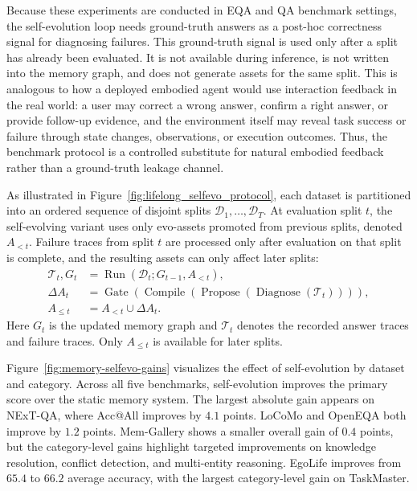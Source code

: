 Because these experiments are conducted in EQA and QA benchmark settings, the self-evolution loop needs ground-truth answers as a post-hoc correctness signal for diagnosing failures.
This ground-truth signal is used only after a split has already been evaluated.
It is not available during inference, is not written into the memory graph, and does not generate assets for the same split.
This is analogous to how a deployed embodied agent would use interaction feedback in the real world: a user may correct a wrong answer, confirm a right answer, or provide follow-up evidence, and the environment itself may reveal task success or failure through state changes, observations, or execution outcomes.
Thus, the benchmark protocol is a controlled substitute for natural embodied feedback rather than a ground-truth leakage channel.

As illustrated in Figure~\ref{fig:lifelong_selfevo_protocol}, each dataset is partitioned into an ordered sequence of disjoint splits
$\mathcal{D}_1,\ldots,\mathcal{D}_T$.
At evaluation split $t$, the self-evolving variant uses only evo-assets promoted from previous splits, denoted $A_{<t}$.
Failure traces from split $t$ are processed only after evaluation on that split is complete, and the resulting assets can only affect later splits:
\begin{align}
    \mathcal{T}_t, G_t
    &= \operatorname{Run}(\mathcal{D}_t; G_{t-1}, A_{<t}), \\
    \Delta A_t
    &= \operatorname{Gate}\!\left(
        \operatorname{Compile}\!\left(
        \operatorname{Propose}\!\left(
        \operatorname{Diagnose}(\mathcal{T}_t)
        \right)\right)\right), \\
    A_{\leq t}
    &= A_{<t} \cup \Delta A_t .
    \label{eq:memory_eval_self_evo_update}
\end{align}
Here $G_t$ is the updated memory graph and $\mathcal{T}_t$ denotes the recorded answer traces and failure traces.
Only $A_{\leq t}$ is available for later splits.


Figure~\ref{fig:memory-selfevo-gains} visualizes the effect of self-evolution by dataset and category.
Across all five benchmarks, self-evolution improves the primary score over the static memory system.
The largest absolute gain appears on NExT-QA, where Acc@All improves by $4.1$ points.
LoCoMo and OpenEQA both improve by $1.2$ points.
Mem-Gallery shows a smaller overall gain of $0.4$ points, but the category-level gains highlight targeted improvements on knowledge resolution, conflict detection, and multi-entity reasoning.
EgoLife improves from $65.4$ to $66.2$ average accuracy, with the largest category-level gain on TaskMaster.


